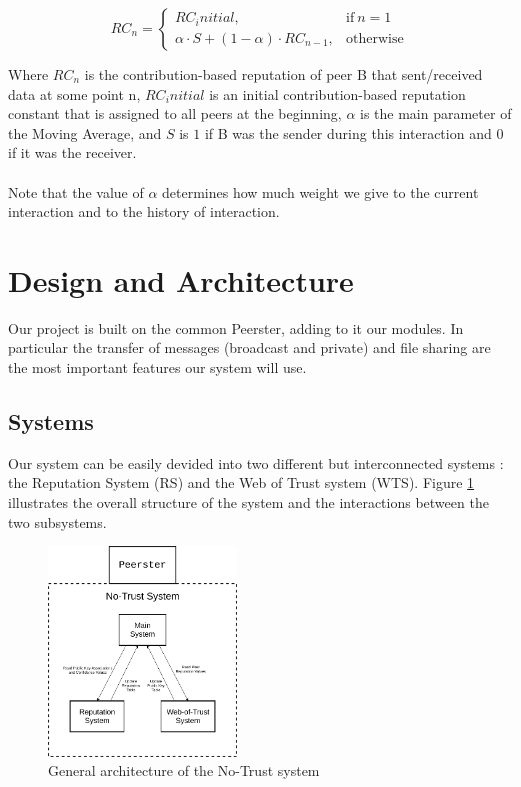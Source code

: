 \documentclass[]{article}
\begin{document}
\begin{equation}
    RC_n =
    \begin{cases}
        RC_initial,                                     & \text{if}\ n = 1
        \\
        \alpha \cdot S + (1 - \alpha) \cdot RC_{n - 1}, & \text{otherwise}
    \end{cases}
\end{equation}

Where $RC_n$ is the contribution-based reputation of peer B that sent/received data at some point n, $RC_initial$ is an initial contribution-based reputation constant that is assigned to all peers at the beginning, $\alpha$ is the main parameter of the Moving Average, and $S$ is $1$ if B was the sender during this interaction and $0$ if it was the receiver.
\\\\
Note that the value of $\alpha$ determines how much weight we give to the current interaction and to the history of interaction.

\section{Design and Architecture}

Our project is built on the common Peerster, adding to it our modules. In particular the transfer of messages (broadcast and private) and file sharing are the most important features our system will use.

\subsection{Systems}
Our system can be easily devided into two different but interconnected systems : the Reputation System (RS) and the Web of Trust system (WTS). \newline
Figure \ref{fig:no-trust-arch} illustrates the overall structure of the system and the interactions between the two subsystems.

\begin{figure}[h]
	\includegraphics[width=50mm]{no-trust-arch}
	\centering
	\caption{General architecture of the No-Trust system}
	\label{fig:no-trust-arch}
\end{figure}
\end{document}

